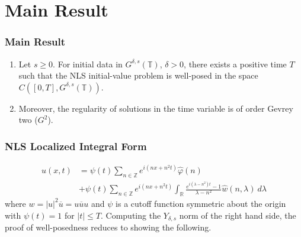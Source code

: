\documentclass{beamer}
\numberwithin{equation}{section}
\begin{document}
\section{Main Result}
\begin{frame}
  \frametitle{Main Result}
%
\begin{theorem}
  \begin{enumerate}
%
\item
Let $s\ge 0$. For initial data in $G^{\delta,s}(\mathbb{T})$, $\delta >0$,
there exists a positive time $T$ such that the NLS initial-value problem
is well-posed in the space $C([0,T], G^{\delta,s}(\mathbb{T}))$.
%
\item
Moreover, the regularity of solutions in the time variable is of order Gevrey
two ($G^2$).
\end{enumerate}
%
\end{theorem}
\end{frame}
%
\begin{frame}
  \frametitle{NLS Localized Integral Form}
\begin{equation*}
  \begin{split}
u(x,t) & =
 \psi(t) \underset{n\in \mathbb{Z}}{\sum} e^{i(nx +n^2t)}  \widehat{\varphi} (n)
\\
& + \psi(t) \underset{n\in \mathbb{Z}}{\sum} e^{i(nx+n^2t)}  \int_{\mathbb{R}}
\frac{e^{i(\lambda-n^2 )t}-1}{\lambda-n^2}
\widehat{w}(n,\lambda) \ d \lambda
\end{split}
\end{equation*}
where $w=|u|^2\overline{u}=u\overline{u}u$ and 
$\psi$ is a cutoff function symmetric about the origin with
$\psi(t)=1$ for $| t | \le T$. Computing the $Y_{\delta,s}$ norm of the right
hand side, the proof of well-posedness reduces to showing the following.
\end{frame}
\end{document}
